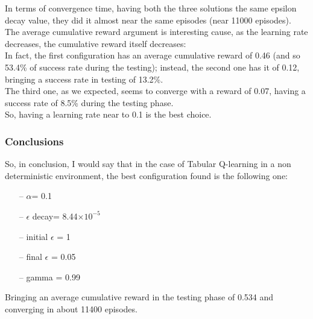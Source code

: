 \documentclass{article}
\begin{document}
\clearpage

In terms of convergence time, having both the three solutions the same epsilon decay value, they did it almost near the same episodes (near 11000 episodes).
\\
The average cumulative reward argument is interesting cause, as the learning rate decreases, the cumulative reward itself decreases:
\\
In fact, the first configuration has an average cumulative reward of 0.46 (and so 53.4\% of success rate during the testing); instead, the second one has it of 0.12, bringing a success rate in testing of 13.2\%.
\\
The third one, as we expected, seems to converge with a reward of 0.07, having a success rate of 8.5\% during the testing phase.
\\
So, having a learning rate near to 0.1 is the best choice. 


\subsubsection{Conclusions}

So, in conclusion, I would say that in the case of Tabular Q-learning in a non deterministic environment, the best configuration found is the following one:


\begin{itemize}
\item[--] $\alpha$= 0.1
\item[--] $\epsilon$ decay= 8.44$\times10^{-5}$
\item[--] initial $\epsilon$ = 1
\item[--] final $\epsilon$ = 0.05
\item[--] gamma = 0.99
\end{itemize}

Bringing an average cumulative reward in the testing phase of 0.534 and converging in about 11400 episodes.
\end{document}
